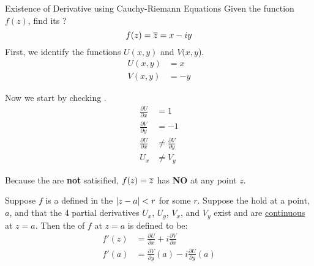 \begin{example}[Lecture 5]{Existence of Derivative using Cauchy-Riemann Equations}
  Given the function $f(z)$, find its ?
  \begin{equation*}
    f(z) = \overline{z} = x - iy
  \end{equation*}
  \tcblower{}
  First, we identify the functions $U(x, y)$ and $V(x, y$).
  \begin{align*}
    U(x, y) &= x \\
    V(x, y) &= -y
  \end{align*}

  Now we start by checking .
  \begin{align*}
    \frac{\partial U}{\partial x} &= 1 \\
    \frac{\partial V}{\partial y} &= -1 \\
    \frac{\partial U}{\partial x} &\neq \frac{\partial V}{\partial y} \\
    U_{x} &\neq V_{y}
  \end{align*}

  Because the  are \textbf{not} satisified, $f(z) = \overline{z}$ has \textbf{NO}  at any point $z$.
\end{example}

\begin{theorem}\label{thm:Cauchy_Riemann_Complex_Function_Derivative}
  Suppose $f$ is a  defined in the  $\lvert z-a \rvert < r$ for some $r$.
  Suppose the  hold at a point, $a$, and that the 4 partial derivatives $U_{x}$, $U_{y}$, $V_{x}$, and $V_{y}$ exist and are \underline{continuous} at $z=a$.
  Then the  of $f$ at $z=a$ is defined to be:
  \begin{equation}\label{eq:Complex_Function_Derivative-Cauchy_Riemann_Equation_Solution}
    \begin{aligned}
      f'(z) &= \frac{\partial U}{\partial x} + i \frac{\partial V}{\partial x} \\
      f'(a) &= \frac{\partial V}{\partial y}(a) - i \frac{\partial U}{\partial y}(a)
    \end{aligned}
  \end{equation}
\end{theorem}


